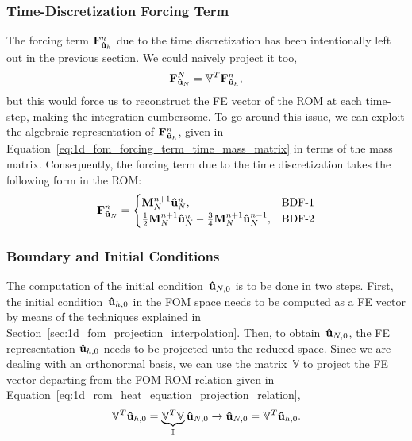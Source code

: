 \documentclass[../../1_heat_equation.tex]{subfiles}
\newcommand{\rbV}{\ensuremath{\mathbb{V}}}
\newcommand{\rbVT}{\ensuremath{\rbV^T}}
\begin{document}
\subsubsection*{Time-Discretization Forcing Term}
The forcing term $\vb{F}_{\vb{\hat{u}}_h}^{n}$ due to the time discretization has been intentionally left out in the previous section.
We could naively project it too, 
\begin{equation}
    \vb{F}_{\vb{\hat{u}}_N}^{N} = \rbVT \vb{F}_{\vb{\hat{u}}_h}^{n},
\end{equation}
but this would force us to reconstruct the FE vector of the ROM at each time-step, making the integration cumbersome.
To go around this issue, we can exploit the algebraic representation of $\vb{F}_{\vb{\hat{u}}_h}^{n}$, given in Equation~\eqref{eq:1d_fom_forcing_term_time_mass_matrix} in terms of the mass matrix. 
Consequently, the forcing term due to the time discretization takes the following form in the ROM:
\begin{equation}
    \vb{F}_{\vb{\hat{u}}_N}^{n} = 
    \begin{cases}
        \vb{M}_{N}^{n+1} \vb{\hat{u}}_{N}^{n}, &\text{BDF-1} \\
        \frac{1}{2}\vb{M}_{N}^{n+1} \vb{\hat{u}}_{N}^{n}
        - \frac{3}{4}\vb{M}_{N}^{n+1} \vb{\hat{u}}_{N}^{n-1}, &\text{BDF-2}
    \end{cases}
\end{equation}

\subsubsection{Boundary and Initial Conditions}
The computation of the initial condition~$\vb{\hat{u}}_{N,0}$ is to be done in two steps. 
First, the initial condition~$\vb{\hat{u}}_{h,0}$ in the FOM space needs to be computed as a FE vector by means of the techniques explained in Section~\ref{sec:1d_fom_projection_interpolation}.
Then, to obtain~$\vb{\hat{u}}_{N,0}$, the FE representation $\vb{\hat{u}}_{h,0}$ needs to be projected unto the reduced space. 
Since we are dealing with an orthonormal basis, we can use the matrix~$\rbV$ to project the FE vector departing from the \mbox{FOM-ROM} relation given in Equation~\eqref{eq:1d_rom_heat_equation_projection_relation},
\begin{equation}
    \rbVT \vb{\hat{u}}_{h,0} = \underbrace{\rbVT \rbV}_{\mathbb{I}} \vb{\hat{u}}_{N,0} 
    \rightarrow 
    \vb{\hat{u}}_{N,0} = \rbVT \vb{\hat{u}}_{h,0}.
\end{equation}
\end{document}
